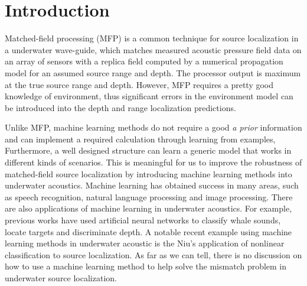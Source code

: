 \section{Introduction}
Matched-field processing (MFP) is a common technique for source localization in a underwater
wave-guide\cite{bucker1976use,baggeroer1988matched,baggeroer1993overview},
which matches measured acoustic pressure field data on an array of sensors with a replica field computed by a numerical propagation model for an assumed source range and depth. The processor output is maximum at the true source range and depth. However, MFP requires a pretty good knowledge of environment, thus significant errors in the environment model can be introduced into the
depth and range localization predictions\cite{tolstoy1989sensitivity,del1988effects}.

Unlike MFP, machine learning methods do not require a good \emph{a prior} information and can implement a required calculation through learning from examples, Furthermore, a well designed structure can learn a generic model that works in different kinds of scenarios. This is meaningful for us to improve the robustness of matched-field source localization by introducing machine learning methods into underwater acoustics.
Machine learning  has obtained success in many areas, such as speech recognition, natural language processing and image processing. There are also applications of machine learning in underwater acoustics.
For example, previous works have used artificial neural networks to classify whale sounds\cite{thode2012automated}, locate targets\cite{steinberg1991neural} and discriminate depth\cite{ozard1991artificial}.
A notable recent example using machine learning methods in underwater acoustic is the Niu's application of nonlinear classification to source localization\cite{niu2017source}. As far as we can tell, there is no discussion on how to use a machine learning method to help solve the mismatch problem in underwater source localization.

